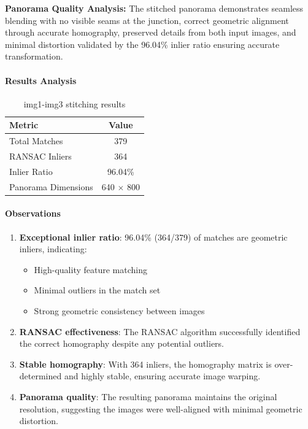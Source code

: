 \documentclass[12pt,a4paper]{article}
\begin{document}
\textbf{Panorama Quality Analysis:}
The stitched panorama demonstrates seamless blending with no visible seams at the junction, correct geometric alignment through accurate homography, preserved details from both input images, and minimal distortion validated by the 96.04\% inlier ratio ensuring accurate transformation.

\paragraph{Results Analysis}
\begin{table}[H]
\centering
\begin{tabular}{@{}lc@{}}
\toprule
\textbf{Metric} & \textbf{Value} \\
\midrule
Total Matches & 379 \\
RANSAC Inliers & 364 \\
Inlier Ratio & 96.04\% \\
Panorama Dimensions & 640 $\times$ 800 \\
\bottomrule
\end{tabular}
\caption{img1-img3 stitching results}
\end{table}

\paragraph{Observations}
\begin{enumerate}
    \item \textbf{Exceptional inlier ratio}: 96.04\% (364/379) of matches are geometric inliers, indicating:
    \begin{itemize}
        \item High-quality feature matching
        \item Minimal outliers in the match set
        \item Strong geometric consistency between images
    \end{itemize}
    
    \item \textbf{RANSAC effectiveness}: The RANSAC algorithm successfully identified the correct homography despite any potential outliers.
    
    \item \textbf{Stable homography}: With 364 inliers, the homography matrix is over-determined and highly stable, ensuring accurate image warping.
    
    \item \textbf{Panorama quality}: The resulting panorama maintains the original resolution, suggesting the images were well-aligned with minimal geometric distortion.
\end{enumerate}
\end{document}
